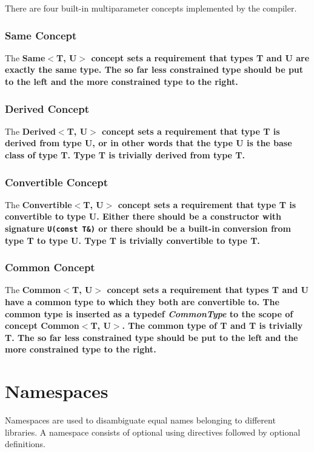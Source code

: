 \documentclass[a4paper,oneside,11pt]{article}
\begin{document}
There are four built-in multiparameter concepts implemented by the compiler.

\subsubsection{Same Concept}

The \bf{Same$<$T, U$>$} concept sets a requirement that types T and U are exactly the same type.
The so far less constrained type should be put to the left and the more constrained type to the right.

\subsubsection{Derived Concept}

The \bf{Derived$<$T, U$>$} concept sets a requirement that type T is derived from type U, or in other words that the type U is the base class of type T. Type T is trivially derived from type T.

\subsubsection{Convertible Concept}

The \bf{Convertible$<$T, U$>$} concept sets a requirement that type T is convertible to type U.
Either there should be a constructor with signature \verb|U(const T&)| or there should be a built-in conversion
from type T to type U. Type T is trivially convertible to type T.

\subsubsection{Common Concept}

The \bf{Common$<$T, U$>$} concept sets a requirement that types T and U have a common type to which they both are convertible to. The common type is inserted as a typedef \emph{CommonType} to the scope of concept \bf{Common$<$T, U$>$}. The common type of T and T is trivially T.
The so far less constrained type should be put to the left and the more constrained type to the right.

\section{Namespaces}\label{namespacedefinition}\label{namespacecontent}

Namespaces are used to disambiguate equal names belonging to different libraries.
A namespace consists of optional using directives followed by optional definitions.
\end{document}
